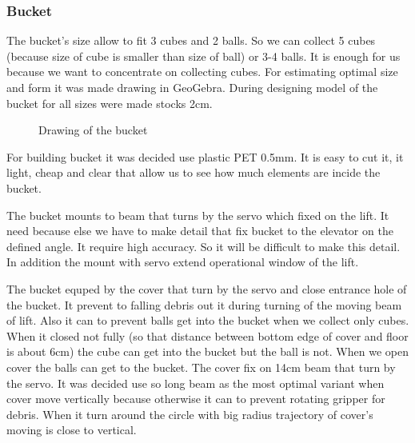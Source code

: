 \subsubsection{Bucket} 
The bucket's size allow to fit 3 cubes and 2 balls. So we can collect 5 cubes (because size of cube is smaller than size of ball) or 3-4 balls. It is enough for us because we want to concentrate on collecting cubes. 	\newline
For estimating optimal size and form it was made drawing in GeoGebra. During designing model of the bucket for all sizes were made stocks 2cm.
\begin{figure}[H]
	\begin{minipage}[h]{1\linewidth}
		\caption{Drawing of the bucket}
	\end{minipage}
\end{figure}

For building bucket it was decided use plastic PET 0.5mm. It is easy to cut it, it light, cheap and clear that allow us to see how much elements are incide the bucket.\newline  

The bucket mounts to beam that turns by the servo which fixed on the lift. It need because else we have to make detail that fix bucket to the elevator on the defined angle. It require high accuracy. So it will be difficult to make this detail. In addition the mount with servo extend operational window of the lift. \newline

The bucket equped by the cover that turn by the servo and close entrance hole of the bucket. It prevent to falling debris out it during turning of the moving beam of lift. Also it can to prevent balls get into the bucket when we collect only cubes. When it closed not fully (so that distance between bottom edge of cover and floor is about 6cm) the cube can get into the bucket but the ball is not. When we open cover the balls can get to the bucket.\newline
The cover fix on 14cm beam that turn by the servo. It was decided use so long beam as the most optimal variant when cover move vertically because otherwise it can to prevent rotating gripper for debris. When it turn around the circle with big radius trajectory of cover's moving is close to vertical.


  	
   	
\fillpage
